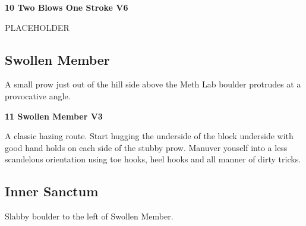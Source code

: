 \begin{multicols*}{2}
					\label{rt:Two Blows One Stroke}\colorbox{RoyalBlue!20}{\textbf{10 Two Blows One Stroke V6  }}
					\begin{adjustwidth}{0.5cm}{}
					\begin{minipage}{\linewidth}					
					PLACEHOLDER
					\end{minipage}
					\end{adjustwidth}
			\subsection*{Swollen Member}\label{bf:Swollen Member}
			\begin{minipage}{\columnwidth}
			A small prow just out of the hill side above the Meth Lab boulder protrudes at a provocative angle.
			\end{minipage}
			
					\label{rt:Swollen Member}\colorbox{green!20}{\textbf{11 Swollen Member V3 \ding{72}   }}
					\begin{adjustwidth}{0.5cm}{}
					\begin{minipage}{\linewidth}					
					A classic hazing route. Start hugging the underside of the block underside with good hand holds on each side of the stubby prow. Manuver youself into a less scandelous orientation using toe hooks, heel hooks and  all manner of dirty tricks.
					\end{minipage}
					\end{adjustwidth}
			\subsection*{Inner Sanctum}\label{bf:Inner Sanctum}
			\begin{minipage}{\columnwidth}
			Slabby boulder to the left of Swollen Member.
			\end{minipage}
			


\end{multicols*}
